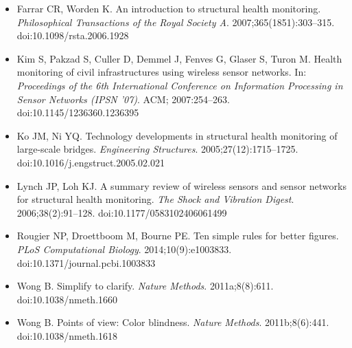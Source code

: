 \begin{itemize}
\item Farrar CR, Worden K. An introduction to structural health monitoring. \textit{Philosophical Transactions of the Royal Society A}. 2007;365(1851):303--315. doi:10.1098/rsta.2006.1928
\item Kim S, Pakzad S, Culler D, Demmel J, Fenves G, Glaser S, Turon M. Health monitoring of civil infrastructures using wireless sensor networks. In: \textit{Proceedings of the 6th International Conference on Information Processing in Sensor Networks (IPSN '07)}. ACM; 2007:254--263. doi:10.1145/1236360.1236395
\item Ko JM, Ni YQ. Technology developments in structural health monitoring of large-scale bridges. \textit{Engineering Structures}. 2005;27(12):1715--1725. doi:10.1016/j.engstruct.2005.02.021
\item Lynch JP, Loh KJ. A summary review of wireless sensors and sensor networks for structural health monitoring. \textit{The Shock and Vibration Digest}. 2006;38(2):91--128. doi:10.1177/0583102406061499
\item Rougier NP, Droettboom M, Bourne PE. Ten simple rules for better figures. \textit{PLoS Computational Biology}. 2014;10(9):e1003833. doi:10.1371/journal.pcbi.1003833
\item Wong B. Simplify to clarify. \textit{Nature Methods}. 2011a;8(8):611. doi:10.1038/nmeth.1660
\item Wong B. Points of view: Color blindness. \textit{Nature Methods}. 2011b;8(6):441. doi:10.1038/nmeth.1618
\end{itemize}

